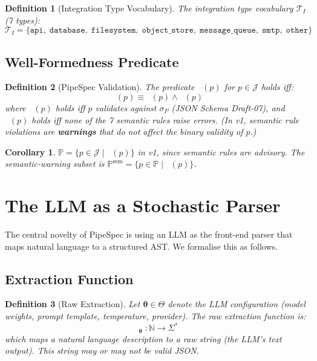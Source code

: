 \documentclass[11pt,a4paper]{article}
\newtheorem{definition}{Definition}[section]
\newtheorem{corollary}{Corollary}[section]
\theoremstyle{definition}
\DeclareMathOperator{\ExtractRaw}{\mathcal{E}^{\text{raw}}_{\bm\theta}}
\DeclareMathOperator{\ValidateP}{\mathcal{V}_P}
\DeclareMathOperator{\ValidateSchemaP}{\mathcal{V}_S}
\DeclareMathOperator{\ValidateSemanticP}{\mathcal{V}_\Sigma}
\newcommand{\nspace}{\mathbb{N}}
\newcommand{\pspace}{\mathbb{P}}
\newcommand{\jspace}{\mathcal{J}}
\begin{document}
\begin{definition}[Integration Type Vocabulary]
The integration type vocabulary $\mathcal{T}_I$ (7 types):
\begin{equation}
\mathcal{T}_I = \{\texttt{api},\; \texttt{database},\; \texttt{filesystem},\; \texttt{object\_store},\; \texttt{message\_queue},\; \texttt{smtp},\; \texttt{other}\}
\end{equation}
\end{definition}

\subsection{Well-Formedness Predicate}
\begin{definition}[PipeSpec Validation]
The predicate $\ValidateP(p)$ for $p \in \jspace$ holds iff:
\begin{equation}
\ValidateP(p) \equiv \ValidateSchemaP(p) \land \ValidateSemanticP(p)
\end{equation}
where $\ValidateSchemaP(p)$ holds iff $p$ validates against $\sigma_P$ (JSON Schema Draft-07), and $\ValidateSemanticP(p)$ holds iff none of the 7 semantic rules raise errors. (In v1, semantic rule violations are \textbf{warnings} that do not affect the binary validity of $p$.)
\end{definition}

\begin{corollary}
$\pspace = \{p \in \jspace \mid \ValidateSchemaP(p)\}$ in v1, since semantic rules are advisory. The semantic-warning subset is $\pspace^{\text{sem}} = \{p \in \pspace \mid \ValidateSemanticP(p)\}$.
\end{corollary}

\section{The LLM as a Stochastic Parser}

The central novelty of PipeSpec is using an LLM as the front-end parser that maps natural language to a structured AST. We formalise this as follows.

\subsection{Extraction Function}
\begin{definition}[Raw Extraction]
Let $\bm\theta \in \Theta$ denote the LLM configuration (model weights, prompt template, temperature, provider). The \emph{raw extraction function} is:
\begin{equation}
\ExtractRaw_{\bm\theta} : \nspace \to \Sigma^*
\end{equation}
which maps a natural language description to a raw string (the LLM's text output). This string may or may not be valid JSON.
\end{definition}
\end{document}

